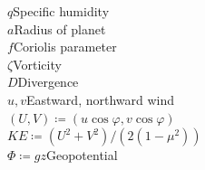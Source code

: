 \documentclass[aspectratio=149,9pt,fleqn,tbtags]{beamer}
\begin{document}
\begin{frame}
\begin{columns}
\begin{column}{.45\textwidth}
\begin{table}[b]
\begin{minipage}{\textwidth}
\begin{minipage}{.5\textwidth}
\begin{tabbing}
							\(q\)\>Specific humidity\\
							\(a\)\>Radius of planet\\
							\(f\)\>Coriolis parameter\\
							\(\zeta\)\>Vorticity\\
							\(D\)\>Divergence\\
							\(u,v\)\>Eastward, northward wind\\
							\((U,V)\coloneqq(u\cos\varphi,v\cos\varphi)\)\\
							\(KE\coloneqq(U^2+V^2)/(2(1-\mu^2))\)\\
							\(\Phi\coloneqq gz\)\quad Geopotential
						\end{tabbing}
					\end{minipage}
					\hfill
					\begin{minipage}{.5\textwidth}
						\hfill
						\begin{tabbing}
							\hspace*{3\zw}\=\kill

\end{tabbing}
\end{minipage}
\end{minipage}
\end{table}
\end{column}
\end{columns}
\end{frame}
\end{document}
